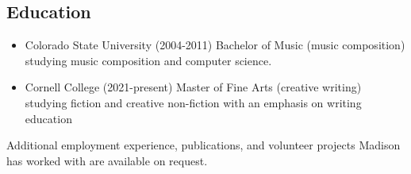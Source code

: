 \documentclass[letterpaper]{memoir}
\begin{document}
\subsection{Education}\label{education}

\begin{description}
\tightlist
\item[University] \hfill
\begin{itemize}
\tightlist
\item
Colorado State University (2004-2011) Bachelor of Music (music composition) studying music composition and computer science.
\item
Cornell College (2021-present) Master of Fine Arts (creative writing) studying fiction and creative non-fiction with an emphasis on writing education
\end{itemize}
\end{description}

Additional employment experience, publications, and volunteer projects
Madison has worked with are available on request.
\end{document}
